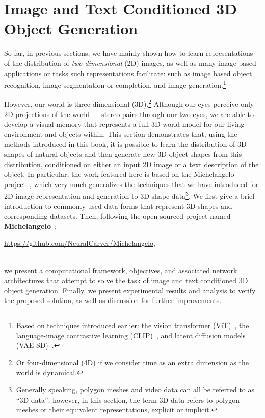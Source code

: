\documentclass[../../book-main.tex]{subfiles}
\begin{document}
\section{Image and Text Conditioned 3D Object Generation}
\label{sec:Michelangelo}\label{sec:object-generation}

So far, in previous sections, we have mainly shown how to learn
representations of the distribution of \textit{two-dimensional} (2D)
images, as well as many image-based applications or tasks such
representations facilitate: such as image based object recognition,
image segmentation or completion, and image
generation.\footnote{Based on techniques introduced earlier: the
vision transformer (ViT)~\citep{NIPS2017_3f5ee243}, the language-image
contrastive learning (CLIP)~\citep{pmlr-v139-radford21a}, and latent
diffusion models (VAE-SD)~\citep{rombach2022high}.}

However, our world is three-dimensional (3D).\footnote{Or
four-dimensional (4D) if we consider time as an extra dimension as
the world is dynamical.} Although our eyes perceive only 2D
projections of the world --- stereo pairs through our two eyes, we are
able to develop a visual memory that represents a full 3D world model
for our living environment and objects within.
This section demonstrates that, using the methods introduced in this
book, it is possible to learn the distribution of 3D shapes of
natural objects and then generate new 3D object shapes from this
distribution, conditioned on either an input 2D image or a text
description of the object.
In particular, the work featured here is
based on the Michelangelo project~\citep{NEURIPS2023_ea1a7f7b}, which
very much generalizes the techniques that we have introduced for 2D
image representation and generation to 3D shape
data\footnote{Generally speaking, polygon meshes and video data can
all be referred to as ``3D data''; however, in this section, the term
3D data refers to polygon meshes or their equivalent representations,
explicit or implicit.}.
We first give a brief introduction to commonly used data forms that
represent 3D shapes and corresponding datasets.
Then, following the
open-sourced project named \textbf{Michelangelo}~\citep{NEURIPS2023_ea1a7f7b}:\\
\centerline{\url{https://github.com/NeuralCarver/Michelangelo},}\\
we present a computational framework, objectives, and associated
network architectures that attempt to solve the task of image and
text conditioned 3D object generation.
Finally, we present
experimental results and analysis to verify the proposed solution, as
well as discussion for further improvements.
\end{document}
